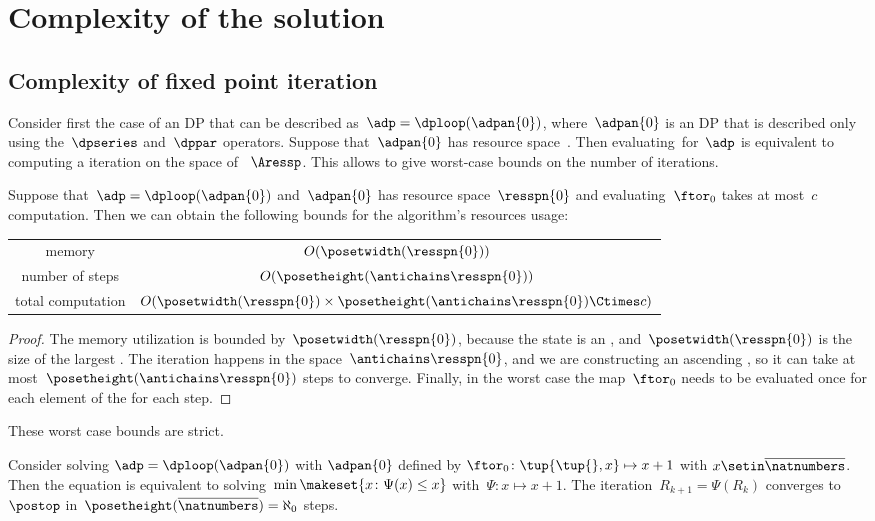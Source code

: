 
\section{Complexity of the solution}

\subsection{Complexity of fixed point iteration}

Consider first the case of an DP that can be described as~$\adp=\dploop(\adpan{0})$, where~$\adpan{0}$ is an DP that is described only using the~$\dpseries$ and~$\dppar$ operators.
Suppose that~$\adpan{0}$ has resource space~\ressp.
Then evaluating~\ftor for~$\adp$ is equivalent to computing a  iteration on the space of ~$\Aressp$.
This allows to give worst-case bounds on the number of iterations.

\begin{proposition}
    \label{prop:complexity}
    Suppose that~$\adp=\dploop(\adpan{0})$ and~$\adpan{0}$ has resource space~$\resspn{0}$ and evaluating~$\ftor_{0}$ takes at most~$c$ computation.
    Then we can obtain the following bounds for the algorithm's resources usage:

    \smallskip{}
    \begin{tabular}{cc}
        memory            & $O(\posetwidth(\resspn{0}))$\tabularnewline
        number of steps   & $O(\posetheight(\antichains\resspn{0}))$\tabularnewline
        total computation & $O(\posetwidth(\resspn{0})\times\posetheight(\antichains\resspn{0})\Ctimes c)$\tabularnewline
    \end{tabular}

\end{proposition}
\begin{proof}
    The memory utilization is bounded by~$\posetwidth(\resspn{0})$, because the state is an , and~$\posetwidth(\resspn{0})$ is the size of the largest .
    The iteration happens in the space~$\antichains\resspn{0}$, and we are constructing an ascending , so it can take at most~$\posetheight(\antichains\resspn{0})$ steps to converge.
    Finally, in the worst case the map~$\ftor_{0}$ needs to be evaluated once for each element of the  for each step.
\end{proof}
These worst case bounds are strict.
\begin{example}
    Consider solving $\adp=\dploop(\adpan{0})$ with $\adpan{0}$ defined by $\ftor_{0}\colon\tup{ \tup{ },x} \mapsto x+1$ with $x\setin\overline{\natnumbers}$.
    Then the  equation is equivalent to solving~$\min\makeset{x\colon\Psi(x)\leq x}$ with~$\Psi:x\mapsto x+1$.
    The iteration~$R_{k+1}=\Psi(R_{k})$ converges to~$\postop$ in~$\posetheight(\overline{\natnumbers})=\aleph_{0}$ steps.
\end{example}

